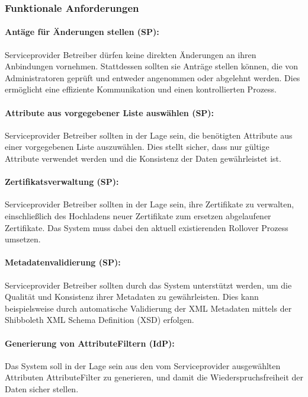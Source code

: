 \documentclass[a4paper, fontsize=11pt]{scrartcl}
\begin{document}
\subsubsection{Funktionale Anforderungen}\label{subsubsec:functional-requirements}

\paragraph{Antäge für Änderungen stellen (SP):}
Serviceprovider Betreiber dürfen keine direkten Änderungen an ihren Anbindungen vornehmen.
Stattdessen sollten sie Anträge stellen können, die von Administratoren geprüft und entweder angenommen oder abgelehnt werden.
Dies ermöglicht eine effiziente Kommunikation und einen kontrollierten Prozess.

\paragraph{Attribute aus vorgegebener Liste auswählen (SP):}
Serviceprovider Betreiber sollten in der Lage sein, die benötigten Attribute aus einer vorgegebenen Liste auszuwählen.
Dies stellt sicher, dass nur gültige Attribute verwendet werden und die Konsistenz der Daten gewährleistet ist.

\paragraph{Zertifikatsverwaltung (SP):}
Serviceprovider Betreiber sollten in der Lage sein, ihre Zertifikate zu verwalten, einschließlich des Hochladens neuer Zertifikate zum ersetzen abgelaufener Zertifikate.
Das System muss dabei den aktuell existierenden Rollover Prozess umsetzen.

\paragraph{Metadatenvalidierung (SP):}
Serviceprovider Betreiber sollten durch das System unterstützt werden, um die Qualität und Konsistenz ihrer Metadaten zu gewährleisten.
Dies kann beispielsweise durch automatische Validierung der XML Metadaten mittels der Shibboleth XML Schema Definition (XSD) erfolgen.

\paragraph{Generierung von AttributeFiltern (IdP):}
Das System soll in der Lage sein aus den vom Serviceprovider ausgewählten Attributen AttributeFilter zu generieren, und damit die Wiederspruchsfreiheit der Daten sicher stellen.
\end{document}
